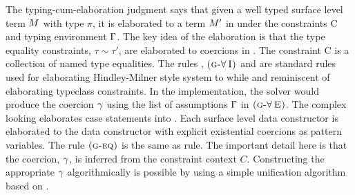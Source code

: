 \documentclass[screen,nonacm]{acmart}
\begin{document}
\newcommand\GADTVar{
 \ib{\irule[\trule{g-var}]
 {x\co\pi \in \TEnv};
 {\GTranslate C \TEnv x {\pi} x}
 }
}
\newcommand\GADTEq{
 \ib{\irule[\trule{g-eq}]
 {\GTranslate C \TEnv \Tm \tau \Tm'}
 {\CoKinding C \Co {\tau \sim \tau'}};
 {\GTranslate C \TEnv \Tm {\tau'} {\Cast {\Tm'} \Co}}
 }
}
\newcommand\GADTForallI{
 \ib{\irule[\trule{g-$\I\forall$}]
 {\GTranslate C \TEnv \Tm \pi \Tm'}
 {\fresh \TyVar {C, \TEnv}};
 {\GTranslate C \TEnv \Tm {\Forall {\TyVar\co\star} \pi} {\TLam {\TyVar\co\star} \Tm'}}
 }
}
\newcommand\GADTForallE{
 \ib{\irule[\trule{g-$\E\forall$}]
 {\GTranslate C \TEnv \Tm {\Forall {\TyVar\co\star} \pi} \Tm'};
 {\GTranslate C \TEnv \Tm {\Set{\TyVar\mapsto\tau}\pi} {\Tm'\App \tau}}
 }
}
\newcommand\GADTCI{
 \ib{\irule[\trule{g-$\I C$}]
 {\GTranslate {C,c:\tau\sim\tau'} \TEnv \Tm {\eta} \Tm'};
 {\GTranslate C \TEnv \Tm {\tau\sim\tau'\then\eta} {\TLam {(c\co\tau\sim\tau')} \Tm'}}
 }
}
\newcommand\GADTCE{
 \ib{\irule[\trule{g-$\E C$}]
 {\GTranslate {C} \TEnv \Tm {\tau\sim\tau'\then\eta} \Tm'}
 {\CoKinding C \Co \tau\sim\tau'};
 {\GTranslate C \TEnv \Tm {\eta} {\Tm'\App\Co}}
 }
}
\newcommand\GADTAlt{
 \ib{\irule[\trule{g-alt}]
 {\substack{
 \mathlarger{H\co \Forall {\many\TyVar} {\Forall {\many\beta} {\many{\tau'\sim\tau''} \then \many\tau \to T\many\TyVar}}}\quad
 \mathlarger{\many\TyVar \cap \many\beta = \varnothing}\quad
 \mathlarger{\fvs{\many\tau, \many{\tau'}, \many{\tau''}} = \fvs{\many\TyVar, \many\beta}}\quad
 \mathlarger{\Subst = \Set{\many{\TyVar\mapsto v}}}\quad
 \mathlarger{\fresh {\many{c}} {C, \TEnv}}\\
 \mathlarger{\GTranslate {C,\many{c\co\Subst{\tau'}\sim\Subst\tau''}\,} {\,\TEnv,\many{x\co\Subst\tau}\,} \Tm {\tau'} \Tm'} }};
 {\GTranslate C \TEnv {H\App\many x \to \Tm} {T\App\many v \to \tau'}
 {H\App(\many{\beta\co\star})\App(\many{c\co\Subst\tau'\sim\Subst\tau''})\App(\many{x\co\Subst\tau}) \to \Tm' }}
 }
}


The typing-cum-elaboration  judgment  says that given a well typed surface level term $M$ with type $\pi$, it is elaborated to a term $M'$ in \SFC under the constraints C and typing environment $\Gamma$. The key idea of the elaboration is that the type equality constraints, $\tau\sim\tau'$, are elaborated to coercions in \SFC. The constraint C is a collection of named type equalities. The rules , $\textsc{(g-\ensuremath{\mathord{\forall}}\!~I)}$ and  are standard rules used for elaborating Hindley-Milner style system\cite{wadler_polymorphism_1989} to \SF while  and  reminiscent of elaborating typeclass constraints. In the implementation, the solver would produce the coercion $\gamma$ using the list of assumptions $\Gamma$ in $\textsc{(g-\ensuremath{\mathord{\forall}}\!~E)}$. The complex looking  elaborates case statements into \SFC. Each surface level data constructor is elaborated to the \SFC data constructor with explicit existential coercions as pattern variables. The rule $\textsc{(g-eq)}$ is the same as  rule. The important detail here is that the coercion, $\gamma$, is inferred from the constraint context $C$. Constructing the appropriate $\gamma$ algorithmically is possible by using a simple unification algorithm based on \cite{lassez_unification_1988}.
\end{document}
